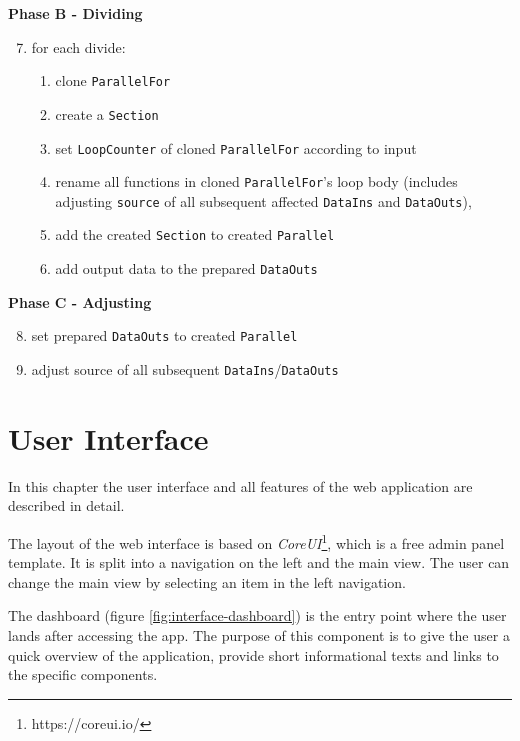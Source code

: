 \documentclass[a4paper,top=25mm,bottom=25mm,12pt,pdftex,halfparskip,twoside,openany,bibtotoc,numbers=noenddot]{scrbook}
\begin{document}
\textbf{Phase B - Dividing}
\begin{enumerate}
\setcounter{enumi}{6}
\item for each divide:
\begin{enumerate}
\item clone \texttt{ParallelFor}
\item create a \texttt{Section}
\item set \texttt{LoopCounter} of cloned \texttt{ParallelFor} according to input
\item rename all functions in cloned \texttt{ParallelFor}'s loop body (includes adjusting \texttt{source} of all subsequent affected \texttt{DataIns} and \texttt{DataOuts}), \item add the created \texttt{Section} to created \texttt{Parallel}
\item add output data to the prepared \texttt{DataOuts}
\end{enumerate}
\end{enumerate}

\vspace{0.8cm}

\textbf{Phase C - Adjusting}
\begin{enumerate}
\setcounter{enumi}{7}
\item set prepared \texttt{DataOuts} to created \texttt{Parallel}
\item adjust source of all subsequent \texttt{DataIns}/\texttt{DataOuts}
\end{enumerate}

\chapter{User Interface}
\label{chap:user-interface}

In this chapter the user interface and all features of the web application are described in detail.

The layout of the web interface is based on \textit{CoreUI}\footnote{https://coreui.io/}, which is a free admin panel template. It is split into a navigation on the left and the main view. The user can change the main view by selecting an item in the left navigation.

The dashboard (figure \ref{fig:interface-dashboard}) is the entry point where the user lands after accessing the app. The purpose of this component is to give the user a quick overview of the application, provide short informational texts and links to the specific components. 
\end{document}
